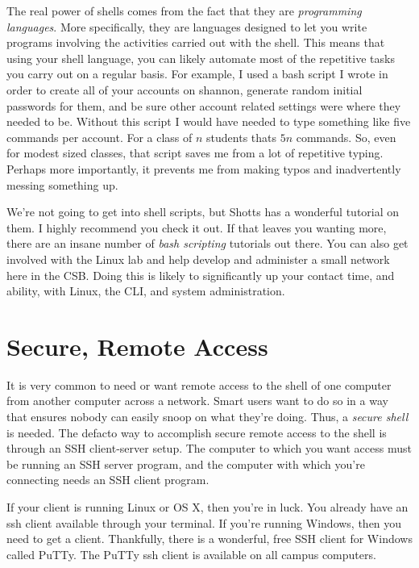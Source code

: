 \documentclass[nobib]{tufte-handout}
\begin{document}
The real power of shells comes from the fact that they are \textit{programming languages}.  More specifically, they are languages designed to let you write programs involving the activities carried out with the shell.  This means that using your shell language, you can likely automate most of the repetitive tasks you carry out on a regular basis.  For example, I used a bash script I wrote in order to create all of your accounts on shannon, generate random initial passwords for them, and be sure other account related settings were where they needed to be.  Without this script I would have needed to type something like five commands per account. For a class of $n$ students thats $5n$ commands.  So, even for modest sized classes, that script saves me from a lot of repetitive typing. Perhaps more importantly, it prevents me from making typos and inadvertently messing something up.

We're not going to get into shell scripts, but Shotts has a wonderful tutorial on them. I highly recommend you check it out.  If that leaves you wanting more, there are an insane number of \textit{bash scripting} tutorials out there.  You can also get involved with the Linux lab and help develop and administer a small network here in the CSB\@.  Doing this is likely to significantly up your contact time, and ability, with Linux, the CLI, and system administration.

\section{Secure, Remote Access}

It is very common to need or want remote access to the shell of one computer from another computer across a network. Smart users want to do so in a way that ensures nobody can easily snoop on what they're doing. Thus, a \textit{secure shell} is needed. The defacto way to accomplish secure remote access to the shell is through an SSH client-server setup.  The computer to which you want access must be running an SSH server program, and the computer with which you're connecting needs an SSH client program.

If your client is running Linux or OS X, then you're in luck. You already have an ssh client available through your terminal.  If you're running Windows, then you need to get a client. Thankfully, there is a wonderful, free SSH client for Windows called PuTTy.  The PuTTy ssh client is available on all campus computers.
\end{document}
